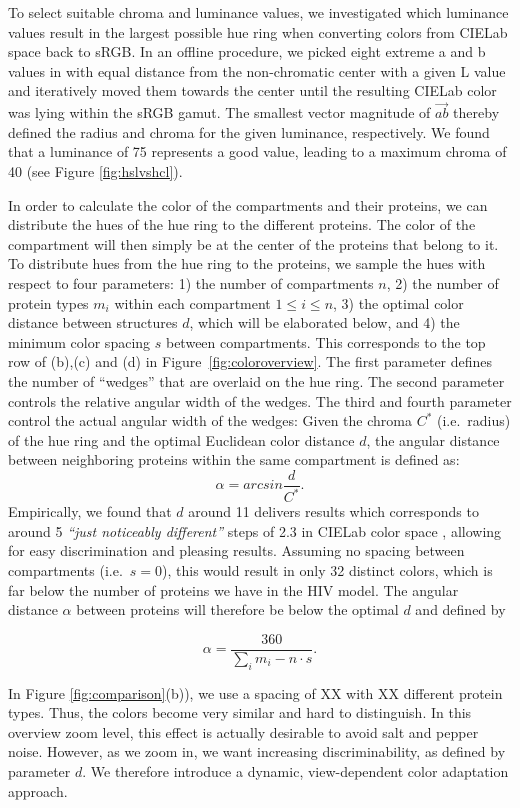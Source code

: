 \documentclass[review,journal]{vgtc}         %
\begin{document}
	To select suitable chroma and luminance values, we investigated which luminance values result in the largest possible hue ring when converting colors from CIELab space back to sRGB. 
	In an offline procedure, we picked eight extreme a and b values in with equal distance from the non-chromatic center with a given L value and iteratively moved them towards the center until the resulting CIELab color was lying within the sRGB gamut. 
	The smallest vector magnitude of $\vec{ab}$ thereby defined the radius and chroma for the given luminance, respectively. 
	We found that a luminance of 75 represents a good value, leading to a maximum chroma of 40 (see Figure \ref{fig:hslvshcl}). 
	
	In order to calculate the color of the compartments and their proteins, we can distribute the hues of the hue ring to the different proteins.
	The color of the compartment will then simply be at the center of the proteins that belong to it.
	To distribute hues from the hue ring to the proteins, we sample the hues with respect to four parameters: 1) the number of compartments $n$, 2) the number of protein types $m_i$ within each compartment $1 \leq i \leq n$, 3) the optimal color distance between structures $d$, which will be elaborated below, and 4) the minimum color spacing $s$ between compartments. 
	This corresponds to the top row of (b),(c) and (d) in Figure~\ref{fig:coloroverview}.
	The first parameter defines the number of ``wedges'' that are overlaid on the hue ring. 
	The second parameter controls the relative angular width of the wedges. 
	The third and fourth parameter control the actual angular width of the wedges: 
	Given the chroma $C^*$ (i.e.\, radius) of the hue ring and the optimal Euclidean color distance $d$, the angular distance between neighboring proteins within the same compartment is defined as: 
	\[
	\alpha = arcsin\frac{d}{C^*}. 
	\]
	Empirically, we found that $d$ around 11 delivers results which corresponds to around 5 \textit{``just noticeably different''} steps of 2.3 in CIELab color space \cite{lee2013perceptually}, allowing for easy discrimination and pleasing results. 
	Assuming no spacing between compartments (i.e.\, $s=0$), this would result in only 32 distinct colors, which is far below the number of proteins we have in the HIV model. 
	The angular distance  $\alpha$ between proteins will therefore be below the optimal $d$ and defined by 
	
	\[
	\alpha= \frac{360}{\sum_{i} m_i - n \cdot s}. 
	\]
	
	In Figure \ref{fig:comparison}(b)), we use a spacing of XX with XX different protein types. 
	Thus, the colors become very similar and hard to distinguish. 
	In this overview zoom level, this effect is actually desirable to avoid salt and pepper noise. 
	However, as we zoom in, we want increasing discriminability, as defined by parameter $d$. 
	We therefore introduce a dynamic, view-dependent color adaptation approach. 
	
\end{document}
